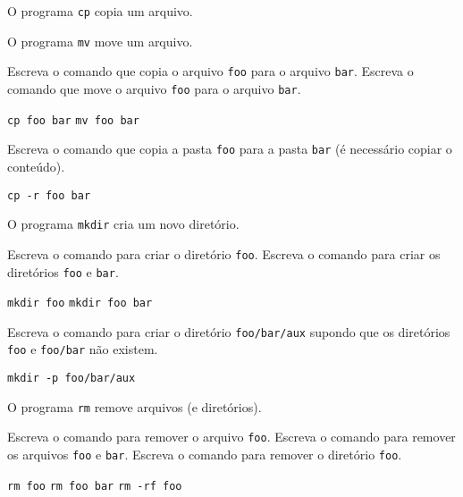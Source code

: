 \begin{Exercise}[label={0018}, difficulty={1}, origin={coreutils}]
  O programa \lstinline+cp+ copia um arquivo.

  O programa \lstinline+mv+ move um arquivo.

  \Question Escreva o comando que copia o arquivo \lstinline+foo+ para o
  arquivo \lstinline+bar+.
  \Question Escreva o comando que move o arquivo \lstinline+foo+ para o
  arquivo \lstinline+bar+.
\end{Exercise}
\begin{Answer}[ref={0018}]
  \Question \lstinline+cp foo bar+
  \Question \lstinline+mv foo bar+
\end{Answer}

\begin{Exercise}[label={0019}, difficulty={2}, origin={coreutils}]
  Escreva o comando que copia a pasta \lstinline+foo+ para a
  pasta \lstinline+bar+ (é necessário copiar o conteúdo).
\end{Exercise}
\begin{Answer}[ref={0019}]
  \Question \lstinline+cp -r foo bar+
\end{Answer}

\begin{Exercise}[label={0020}, difficulty={1}, origin={coreutils}]
  O programa \lstinline+mkdir+ cria um novo diretório.

  \Question Escreva o comando para criar o diretório \lstinline+foo+.
  \Question Escreva o comando para criar os diretórios \lstinline+foo+ e
  \lstinline+bar+.
\end{Exercise}
\begin{Answer}[ref={0020}]
  \Question \lstinline+mkdir foo+
  \Question \lstinline+mkdir foo bar+
\end{Answer}

\begin{Exercise}[label={0021}, difficulty={2}, origin={coreutils}]
  Escreva o comando para criar o diretório \lstinline+foo/bar/aux+ supondo que
  os diretórios \lstinline+foo+ e \lstinline+foo/bar+ não existem.
\end{Exercise}
\begin{Answer}[ref={0021}]
  \lstinline+mkdir -p foo/bar/aux+
\end{Answer}

\begin{Exercise}[label={0022}, difficulty={1}, origin={coreutils}]
  O programa \lstinline+rm+ remove arquivos (e diretórios).

  \Question Escreva o comando para remover o arquivo \lstinline+foo+.
  \Question Escreva o comando para remover os arquivos \lstinline+foo+ e
  \lstinline+bar+.
  \Question Escreva o comando para remover o diretório \lstinline+foo+.
\end{Exercise}
\begin{Answer}[ref={0022}]
  \lstinline+rm foo+
  \lstinline+rm foo bar+
  \lstinline+rm -rf foo+
\end{Answer}

